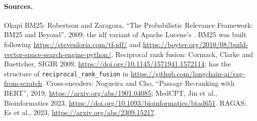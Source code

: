 \paragraph{Sources.}
Okapi BM25: Robertson and Zaragoza, ``The Probabilistic Relevance Framework: BM25 and Beyond'', 2009;
the idf variant of Apache Lucene's . BM25 was built following
\url{https://stevenloria.com/tf-idf/} and
\url{https://boyter.org/2010/08/build-vector-space-search-engine-python/}.
Reciprocal rank fusion: Cormack, Clarke and Buettcher, SIGIR 2009,
\url{https://doi.org/10.1145/1571941.1572114};  has the structure of
\nolinkurl{reciprocal_rank_fusion} in \url{https://github.com/langchain-ai/rag-from-scratch}.
Cross-encoders: Nogueira and Cho, ``Passage Re-ranking with BERT'', 2019,
\url{https://arxiv.org/abs/1901.04085}; MedCPT, Jin et al., Bioinformatics 2023,
\url{https://doi.org/10.1093/bioinformatics/btad651}.
RAGAS: Es et al., 2023, \url{https://arxiv.org/abs/2309.15217}.



